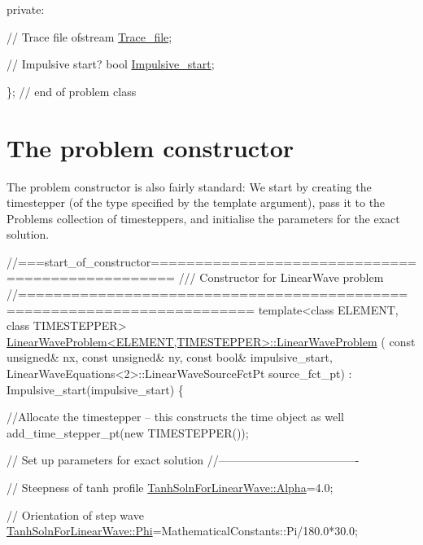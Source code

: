 \begin{DoxyCodeInclude}
\textcolor{keyword}{private}:

 \textcolor{comment}{// Trace file}
 ofstream \hyperlink{classLinearWaveProblem_ac75d13211cfb08c7cfba0ea129711a09}{Trace\_file};

 \textcolor{comment}{// Impulsive start?}
 \textcolor{keywordtype}{bool} \hyperlink{classLinearWaveProblem_a296c67402f065a1a3776064492003670}{Impulsive\_start};

\}; \textcolor{comment}{// end of problem class}

\end{DoxyCodeInclude}




 

\hypertarget{index_constructor}{}\section{The problem constructor}\label{index_constructor}
The problem constructor is also fairly standard\+: We start by creating the timestepper (of the type specified by the template argument), pass it to the Problem\textquotesingle{}s collection of timesteppers, and initialise the parameters for the exact solution.


\begin{DoxyCodeInclude}
\textcolor{comment}{//===start\_of\_constructor=================================================}
\textcolor{comment}{/// Constructor for LinearWave problem }
\textcolor{comment}{}\textcolor{comment}{//========================================================================}
\textcolor{keyword}{template}<\textcolor{keyword}{class} ELEMENT, \textcolor{keyword}{class} TIMESTEPPER>
\hyperlink{classLinearWaveProblem_a459a58b7afd588cfa78a5e1e98c3c41e}{LinearWaveProblem<ELEMENT,TIMESTEPPER>::LinearWaveProblem}
      (
 \textcolor{keyword}{const} \textcolor{keywordtype}{unsigned}& nx, \textcolor{keyword}{const} \textcolor{keywordtype}{unsigned}& ny, \textcolor{keyword}{const} \textcolor{keywordtype}{bool}& impulsive\_start, 
 LinearWaveEquations<2>::LinearWaveSourceFctPt source\_fct\_pt) :
 Impulsive\_start(impulsive\_start)
\{ 

 \textcolor{comment}{//Allocate the timestepper -- this constructs the time object as well}
 add\_time\_stepper\_pt(\textcolor{keyword}{new} TIMESTEPPER());

 \textcolor{comment}{// Set up parameters for exact solution}
 \textcolor{comment}{//-------------------------------------}

 \textcolor{comment}{// Steepness of tanh profile}
 \hyperlink{namespaceTanhSolnForLinearWave_a48021142056bdea20e6432e360fd0314}{TanhSolnForLinearWave::Alpha}=4.0;

 \textcolor{comment}{// Orientation of step wave}
 \hyperlink{namespaceTanhSolnForLinearWave_a5242d421b567b803323bc127081351a6}{TanhSolnForLinearWave::Phi}=MathematicalConstants::Pi/180.0*30.0;

\end{DoxyCodeInclude}


